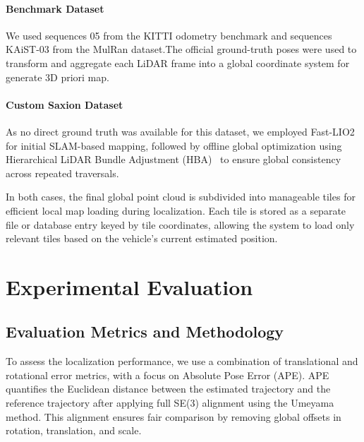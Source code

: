 \paragraph{Benchmark Dataset}
 We used sequences 05 from the KITTI odometry benchmark\cite{Geiger2012KITTI} and sequences  KAiST-03 from the MulRan dataset\cite{Kim2020Mulran}.The official ground-truth poses were used to transform and aggregate each LiDAR frame into a global coordinate system for generate 3D priori map.
\paragraph{Custom Saxion Dataset}
As no direct ground truth was available for this dataset, we employed Fast-LIO2 for initial SLAM-based mapping, followed by offline global optimization using Hierarchical LiDAR Bundle Adjustment (HBA)~\cite{liu2023hba} to ensure global consistency across repeated traversals.

In both cases, the final global point cloud is subdivided into manageable tiles for efficient local map loading during localization. Each tile is stored as a separate file or database entry keyed by tile coordinates, allowing the system to load only relevant tiles based on the vehicle’s current estimated position.
\section{Experimental Evaluation}
\subsection{Evaluation Metrics and Methodology}
To assess the localization performance, we use a combination of translational and rotational error metrics, with a focus on Absolute Pose Error (APE). APE quantifies the Euclidean distance between the estimated trajectory and the reference trajectory after applying full SE(3) alignment using the Umeyama method. This alignment ensures fair comparison by removing global offsets in rotation, translation, and scale.

